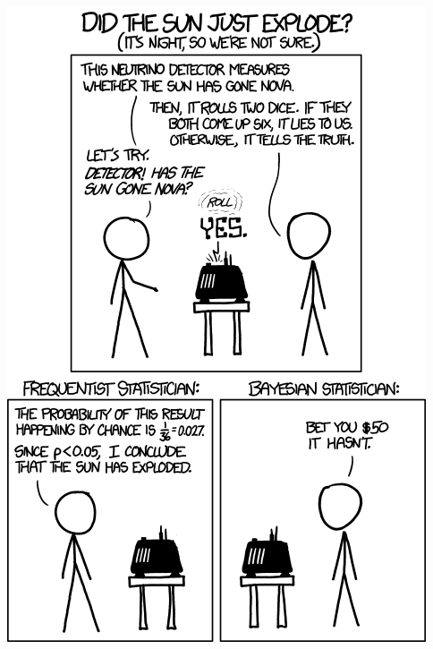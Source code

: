\documentclass{beamer}
\begin{document}
\begin{frame}{}
\begin{center}
        \includegraphics[height=.9\paperheight]{graphics/frequentists_vs_bayesians.png}
\end{center}
\end{frame}
\end{document}
